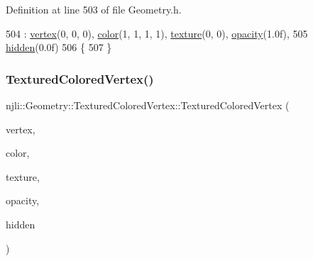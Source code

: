 Definition at line 503 of file Geometry.\+h.


\begin{DoxyCode}
504           : \mbox{\hyperlink{structnjli_1_1_geometry_1_1_textured_colored_vertex_ab49b5720f1cdbf1c63e62681db8f090f}{vertex}}(0, 0, 0), \mbox{\hyperlink{structnjli_1_1_geometry_1_1_textured_colored_vertex_a79e6bb9cb0daa0307eac09b828e4d993}{color}}(1, 1, 1, 1), \mbox{\hyperlink{structnjli_1_1_geometry_1_1_textured_colored_vertex_a933ff52f4cd0a7768836e458f1a1218c}{texture}}(0, 0), 
      \mbox{\hyperlink{structnjli_1_1_geometry_1_1_textured_colored_vertex_a8c7d91ac68083909b5116f7d130c39ca}{opacity}}(1.0f),
505             \mbox{\hyperlink{structnjli_1_1_geometry_1_1_textured_colored_vertex_a506ec1fdd64c4b0530a33a53d075c3d2}{hidden}}(0.0f)
506       \{
507       \}
\end{DoxyCode}
\mbox{\label{structnjli_1_1_geometry_1_1_textured_colored_vertex_ab9fb6f1e0a5a679e666072a8ee0a4c41}} 
\subsubsection{\texorpdfstring{Textured\+Colored\+Vertex()}{TexturedColoredVertex()}\hspace{0.1cm}{\footnotesize\ttfamily [2/2]}}
{\footnotesize\ttfamily njli\+::\+Geometry\+::\+Textured\+Colored\+Vertex\+::\+Textured\+Colored\+Vertex (\begin{DoxyParamCaption}\item[{const bt\+Vector3}]{vertex,  }\item[{const bt\+Vector4}]{color,  }\item[{const bt\+Vector2}]{texture,  }\item[{const \mbox{\hyperlink{_util_8h_a5f6906312a689f27d70e9d086649d3fd}{f32}}}]{opacity,  }\item[{const \mbox{\hyperlink{_util_8h_a5f6906312a689f27d70e9d086649d3fd}{f32}}}]{hidden }\end{DoxyParamCaption})\hspace{0.3cm}{\ttfamily [inline]}}



